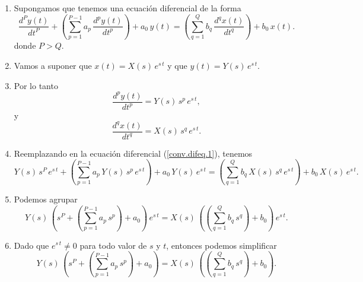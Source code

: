 \documentclass[11pt,a4paper,openany]{book}
\begin{document}
\begin{enumerate}
	\item Supongamos que tenemos una ecuación diferencial de la forma
	\begin{equation}
		\frac{d^{P}y\left( t\right) }{dt^{P}} +
		\left(\sum_{p=1}^{P-1}a_{p} \, \frac{d^{p}y\left( t\right) }{dt^{p}}\right) + 
		a_{0} \, y(t) =
		\left(\sum_{q=1}^{Q}b_{q} \, \frac{d^{q}x\left( t\right) }{dt^{q}}\right) + 
		b_{0} \, x(t).
		\label{conv.difeq.1}
	\end{equation}
	donde $P > Q$.
	
	\item Vamos a suponer que $x(t) = X(s) \, e^{s \, t}$ y que $y(t) = Y(s) \, e^{s \, t}$.
	
	\item Por lo tanto
	\begin{equation}
		\frac{d^{p}y\left( t\right) }{dt^{p}} = Y(s) \, s^{p} \, e^{s \, t},
	\end{equation}
	y
	\begin{equation}
		\frac{d^{q}x\left( t\right) }{dt^{q}} = X(s) \, s^{q} \, e^{s \, t}.
	\end{equation}
	
	\item Reemplazando en la ecuación diferencial (\ref{conv.difeq.1}), tenemos
	\begin{equation}
		Y(s) \, s^{P} \, e^{s \, t} +
		\left(\sum_{p=1}^{P-1}a_{p} \, Y(s) \, s^{p} \, e^{s \, t}\right) + 
		a_{0} \, Y(s) \, e^{s \, t} =
		\left(\sum_{q=1}^{Q}b_{q} \, X(s) \, s^{q} \, e^{s \, t}\right) + 
		b_{0} \, X(s) \, e^{s \, t}.
		\label{conv.difeq.2}
	\end{equation}
	
	\item Podemos agrupar
	\begin{equation}
		Y(s) \, \left(s^{P}  +
		\left(\sum_{p=1}^{P-1}a_{p} \, s^{p}\right) + 
		a_{0} \right) \, e^{s \, t} =
		X(s) \, \left(\left(\sum_{q=1}^{Q}b_{q} \, s^{q}\right) + 
		b_{0} \right) \, e^{s \, t}.
		\label{conv.difeq.3}
	\end{equation}
	
	\item Dado que $e^{s \, t} \neq 0$ para todo valor de $s$ y $t$, entonces podemos simplificar
	\begin{equation}
		Y(s) \, \left(s^{P}  +
		\left(\sum_{p=1}^{P-1}a_{p} \, s^{p}\right) + 
		a_{0} \right) =
		X(s) \, \left(\left(\sum_{q=1}^{Q}b_{q} \, s^{q}\right) + 
		b_{0} \right).
		\label{conv.difeq.4}
	\end{equation}
	

\end{enumerate}
\end{document}
